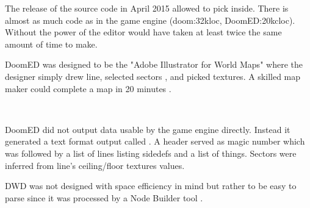 The release of the source code in April 2015 allowed to pick inside. There is almost as much code as in the game engine (doom:32kloc, DoomED:20kcloc). Without the power of \NeXT the editor would have taken at least twice the same amount of time to make.



\par
DoomED was designed to be the "Adobe Illustrator for World Maps" where the designer simply drew line, selected sectors , and picked textures. A skilled map maker could complete a map in 20 minutes .\\
\par

\\
\par
{}


\vspace{-4mm}
DoomED did not output data usable by the game engine directly. Instead it generated a text format output called . A header served as magic number which was followed by a list of lines listing sidedefs and a list of things. Sectors were inferred from line's ceiling/floor textures values.\\
\par
{}
\par
DWD was not designed with space efficiency in mind but rather to be easy to parse since it was processed by a Node Builder tool .\\
\par
{}
\par

\pagebreak





